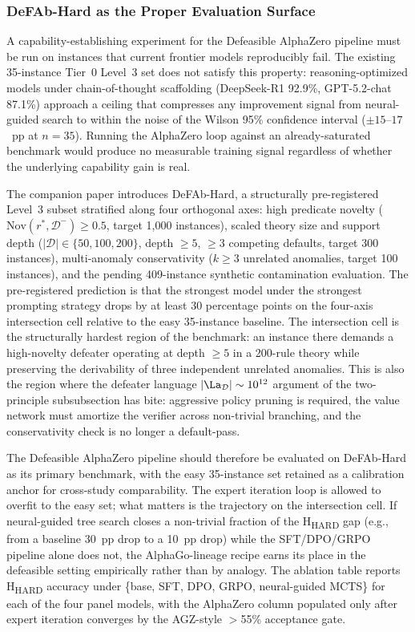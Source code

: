 \documentclass{article}
\newcommand{\D}{\mathcal{D}}
\newcommand{\Dm}{\mathcal{D}^{-}}
\newcommand{\Nov}{\mathrm{Nov}}
\begin{document}
\subsubsection{DeFAb-Hard as the Proper Evaluation Surface}

A capability-establishing experiment for the Defeasible AlphaZero pipeline must be run on instances that current frontier models reproducibly fail. The existing 35-instance Tier~0 Level~3 set does not satisfy this property: reasoning-optimized models under chain-of-thought scaffolding (DeepSeek-R1 92.9\%, GPT-5.2-chat 87.1\%) approach a ceiling that compresses any improvement signal from neural-guided search to within the noise of the Wilson 95\% confidence interval ($\pm 15$--$17$~pp at $n = 35$). Running the AlphaZero loop against an already-saturated benchmark would produce no measurable training signal regardless of whether the underlying capability gain is real.

The companion paper introduces DeFAb-Hard, a structurally pre-registered Level~3 subset stratified along four orthogonal axes: high predicate novelty ($\Nov(r^*, \Dm) \geq 0.5$, target 1{,}000 instances), scaled theory size and support depth ($|\D| \in \{50, 100, 200\}$, depth $\geq 5$, $\geq 3$ competing defaults, target 300 instances), multi-anomaly conservativity ($k \geq 3$ unrelated anomalies, target 100 instances), and the pending 409-instance synthetic contamination evaluation. The pre-registered prediction is that the strongest model under the strongest prompting strategy drops by at least 30 percentage points on the four-axis intersection cell relative to the easy 35-instance baseline. The intersection cell is the structurally hardest region of the benchmark: an instance there demands a high-novelty defeater operating at depth $\geq 5$ in a 200-rule theory while preserving the derivability of three independent unrelated anomalies. This is also the region where the defeater language $|\La_\D| \sim 10^{12}$ argument of the two-principle subsubsection has bite: aggressive policy pruning is required, the value network must amortize the verifier across non-trivial branching, and the conservativity check is no longer a default-pass.

The Defeasible AlphaZero pipeline should therefore be evaluated on DeFAb-Hard as its primary benchmark, with the easy 35-instance set retained as a calibration anchor for cross-study comparability. The expert iteration loop is allowed to overfit to the easy set; what matters is the trajectory on the intersection cell. If neural-guided tree search closes a non-trivial fraction of the H\textsubscript{HARD} gap (e.g., from a baseline 30~pp drop to a 10~pp drop) while the SFT/DPO/GRPO pipeline alone does not, the AlphaGo-lineage recipe earns its place in the defeasible setting empirically rather than by analogy. The ablation table reports H\textsubscript{HARD} accuracy under \{base, SFT, DPO, GRPO, neural-guided MCTS\} for each of the four panel models, with the AlphaZero column populated only after expert iteration converges by the AGZ-style $>$55\% acceptance gate.
\end{document}
